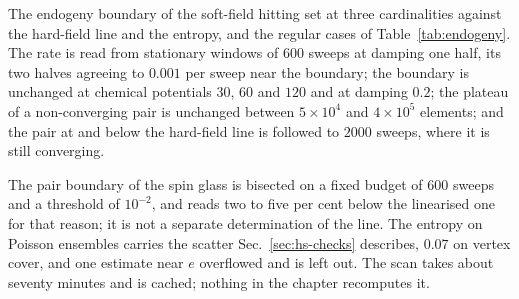 The endogeny boundary of the soft-field hitting set at three
cardinalities against the hard-field line and the entropy, and the
regular cases of Table~\ref{tab:endogeny}. The rate is read from
stationary windows of $600$ sweeps at damping one half, its two halves
agreeing to $0.001$ per sweep near the boundary; the boundary is
unchanged at chemical potentials $30$, $60$ and $120$ and at damping
$0.2$; the plateau of a non-converging pair is unchanged between
$5\times10^{4}$ and $4\times10^{5}$ elements; and the pair at and below
the hard-field line is followed to $2000$ sweeps, where it is still
converging.

The pair boundary of the spin glass is bisected on a fixed budget of
$600$ sweeps and a threshold of $10^{-2}$, and reads two to five per cent
below the linearised one for that reason; it is not a separate
determination of the line. The entropy on Poisson ensembles carries the
scatter Sec.~\ref{sec:hs-checks} describes, $0.07$ on vertex cover, and
one estimate near $e$ overflowed and is left out. The scan takes about
seventy minutes and is cached; nothing in the chapter recomputes it.
